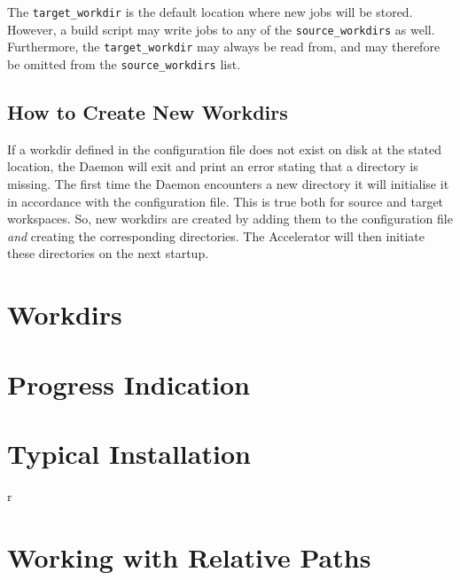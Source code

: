The \texttt{target\_workdir} is the default location where new jobs
will be stored.  However, a build script may write jobs to any of the
\texttt{source\_workdirs} as well.  Furthermore, the \texttt{target\_workdir}
may always be read from, and may therefore be omitted from
the \texttt{source\_workdirs} list.

\subsection{How to Create New Workdirs}
If a workdir defined in the configuration file does not exist on disk
at the stated location, the Daemon will exit and print an error
stating that a directory is missing.  The first time the Daemon
encounters a new directory it will initialise it in accordance with
the configuration file.  This is true both for source and target
workspaces.  So, new workdirs are created by adding them to the
configuration file \textsl{and} creating the corresponding
directories.  The Accelerator will then initiate these directories on
the next startup.













\section{Workdirs}





\section{Progress Indication}




\section{Typical Installation}
r


\section{Working with Relative Paths}


